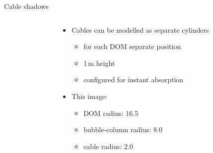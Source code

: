 
\begin{frame}[fragile]{Cable shadows}

  \begin{columns}
    \begin{column}{0.5\textwidth}


    \end{column}
    \begin{column}{0.5\textwidth}

      \begin{itemize}
        \item Cables can be modelled as separate cylinders
          \begin{itemize}
            \item for each DOM separate position
            \item 1\,m height
            \item configured for instant absorption
          \end{itemize}
        \item This image:
          \begin{itemize}
            \item DOM radius: 16.5\cm
            \item bubble-column radius: 8.0\cm
            \item cable radius: 2.0\cm
          \end{itemize}
      \end{itemize}

    \end{column}
  \end{columns}

\end{frame}